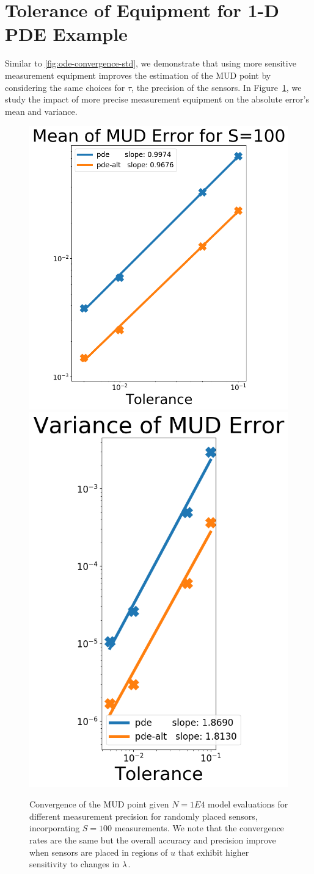 \section{Tolerance of Equipment for 1-D PDE Example}
Similar to \ref{fig:ode-convergence-std}, we demonstrate that using more sensitive measurement equipment improves the estimation of the MUD point by considering the same choices for $\tau$, the precision of the sensors.
In Figure~\ref{fig:pde-convergence-std}, we study the impact of more precise measurement equipment on the absolute error's mean and variance.


\begin{figure}[htbp]
  \centering
  \includegraphics[width=0.475\linewidth]{figures/pde/pde_convergence_mud_std_mean}
  \includegraphics[width=0.475\linewidth]{figures/pde/pde_convergence_mud_std_var}
  \caption{Convergence of the MUD point given $N=1E4$ model evaluations for different measurement precision for randomly placed sensors, incorporating $S=100$ measurements.
  We note that the convergence rates are the same but the overall accuracy and precision improve when sensors are placed in regions of $u$ that exhibit higher sensitivity to changes in $\lambda$.
  }
  \label{fig:pde-convergence-std}
\end{figure}
